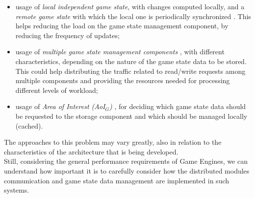 \begin{itemize}
	\item usage of \textit{local independent game state}, with changes computed locally, and a \textit{remote game state} with which the local one is periodically synchronized \cite{womak:distributed-architecture-interactive-multiplayer}. This helps reducing the load on the game state management component, by reducing the frequency of updates;
	\item usage of \textit{multiple game state management components} \cite{womak:multiplayer-distributed-state}, with different characteristics, depending on the nature of the game state data to be stored. This could help distributing the traffic related to read/write requests among multiple components and providing the resources needed for processing different levels of workload;
	\item usage of \textit{Area of Interest (AoI$_G$)} \cite{womak:distributed-minecraft, womak:distributed-architecture-interactive-multiplayer}, for deciding which game state data should be requested to the storage component and which should be managed locally (cached).
\end{itemize}
The approaches to this problem may vary greatly, also in relation to the characteristics of the architecture that is being developed. \\
Still, considering the general performance requirements of Game Engines, we can understand how important it is to carefully consider how the distributed modules communication and game state data management are implemented in such systems.